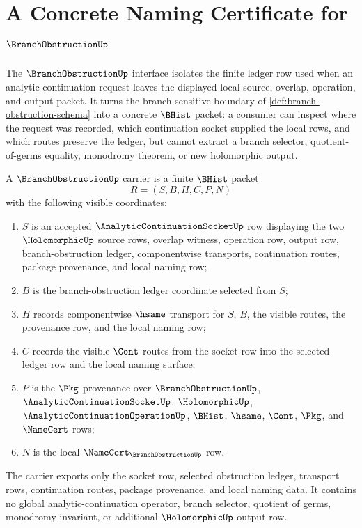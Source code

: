\chapter{A Concrete Naming Certificate for $\BranchObstructionUp$}
\label{ch:concrete-instances-branchobstruction-namecert}

The $\BranchObstructionUp$ interface isolates the finite ledger row used when an analytic-continuation request leaves the displayed local source, overlap, operation, and output packet. It turns the branch-sensitive boundary of \autoref{def:branch-obstruction-schema} into a concrete $\BHist$ packet: a consumer can inspect where the request was recorded, which continuation socket supplied the local rows, and which routes preserve the ledger, but cannot extract a branch selector, quotient-of-germs equality, monodromy theorem, or new holomorphic output.

\begin{definition}
\label{def:branch-obstruction-carrier}
A $\BranchObstructionUp$ carrier is a finite $\BHist$ packet
$$
R=(S,B,H,C,P,N)
$$
with the following visible coordinates:
\begin{enumerate}
\item $S$ is an accepted $\AnalyticContinuationSocketUp$ row displaying the two $\HolomorphicUp$ source rows, overlap witness, operation row, output row, branch-obstruction ledger, componentwise transports, continuation routes, package provenance, and local naming row;
\item $B$ is the branch-obstruction ledger coordinate selected from $S$;
\item $H$ records componentwise $\hsame$ transport for $S$, $B$, the visible routes, the provenance row, and the local naming row;
\item $C$ records the visible $\Cont$ routes from the socket row into the selected ledger row and the local naming surface;
\item $P$ is the $\Pkg$ provenance over $\BranchObstructionUp$, $\AnalyticContinuationSocketUp$, $\HolomorphicUp$, $\AnalyticContinuationOperationUp$, $\BHist$, $\hsame$, $\Cont$, $\Pkg$, and $\NameCert$ rows;
\item $N$ is the local $\NameCert_{\BranchObstructionUp}$ row.
\end{enumerate}
The carrier exports only the socket row, selected obstruction ledger, transport rows, continuation routes, package provenance, and local naming data. It contains no global analytic-continuation operator, branch selector, quotient of germs, monodromy invariant, or additional $\HolomorphicUp$ output row.
\end{definition}

